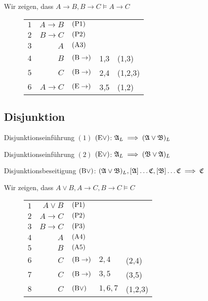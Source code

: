 \documentclass[11pt, a4paper]{article}
\begin{document}
\begin{bsp}
	Wir zeigen, dass $A \rightarrow B, B \rightarrow C \models A \rightarrow C$
	\begin{figure}[h]
	\centering
	
	
	\begin{tabular}{l r | l l l}
		$1$ & $A \rightarrow B$ &  $(\text{P}1)$ & &\\
		$2$ & $B \rightarrow C$ &  $(\text{P}2)$ & &\\
		$3$ & $A$ &  $(\text{A}3)$ & &\\
		$4$ & $B$ &  $(\text{B}\rightarrow)$ & 1,3 & (1,3)\\
		$5$ & $C$ &  $(\text{B}\rightarrow)$ & 2,4 & (1,2,3)\\
		$6$ & $A \rightarrow C$ &  $(\text{E}\rightarrow)$ & 3,5 & (1,2)\\
	\end{tabular}


	\end{figure}
\end{bsp}

\subsection{Disjunktion}

\begin{regel}{Disjunktionseinführung $(1)$}{}
	$(\text{E}\lor)$: $\mathfrak{A}_L \implies (\mathfrak{A} \lor \mathfrak{B})_L$		
\end{regel}

\begin{regel}{Disjunktionseinführung $(2)$}{}
	$(\text{E}\lor)$: $\mathfrak{A}_L \implies (\mathfrak{B} \lor \mathfrak{A})_L$		
\end{regel}


\begin{regel}{Disjunktionsbeseitigung}{}
	$(\text{B}\lor)$: $(\mathfrak{A} \lor \mathfrak{B})_L, [\mathfrak{A}] \dots \mathfrak{C}, [\mathfrak{B}] \dots \mathfrak{C} \implies \mathfrak{C}$		
\end{regel}

\newpage

\begin{bsp} 
	Wir zeigen, dass $A \lor B, A \rightarrow C, B \rightarrow C \models C$
	\begin{figure}[H]
	\centering
	
	
	\begin{tabular}{l r | l l l}
		$1$ & $A \lor B$ &  $(\text{P}1)$ & &\\
		$2$ & $A \rightarrow C$ &  $(\text{P}2)$ & &\\
		$3$ & $B \rightarrow C$ &  $(\text{P}3)$ & &\\
		$4$ & $A$ &  $(\text{A}4)$ & &\\
		$5$ & $B$ &  $(\text{A}5)$ & &\\
		$6$ & $C$ &  $(\text{B}\rightarrow)$ & $2,4$ & (2,4)\\
		$7$ & $C$ &  $(\text{B}\rightarrow)$ & $3,5$ & (3,5)\\
		$8$ & $C$ &  $(\text{B}\lor)$ & $1,6,7$ & (1,2,3)\\
	\end{tabular}


	\end{figure}
\end{bsp}
\end{document}
